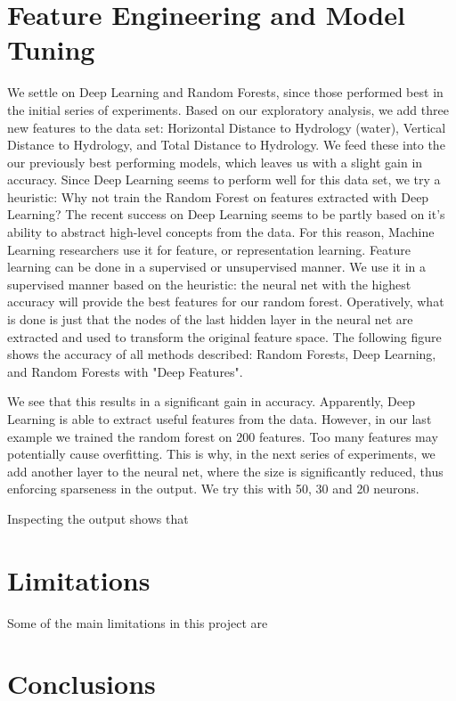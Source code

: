 \documentclass[paper=a4, fontsize=11pt]{scrartcl}
\numberwithin{equation}{section}
\numberwithin{figure}{section}
\numberwithin{table}{section}
\begin{document}
\section{Feature Engineering and Model Tuning}
We settle on Deep Learning and Random Forests, since those performed best in the initial series of experiments. Based on our exploratory analysis, we add three new features to the data set: Horizontal Distance to Hydrology (water), Vertical Distance to Hydrology, and Total Distance to Hydrology. We feed these into the our previously best performing models, which leaves us with a slight gain in accuracy. 
Since Deep Learning seems to perform well for this data set, we try a heuristic: Why not train the Random Forest on features extracted with Deep Learning? The recent success on Deep Learning seems to be partly based on it's ability to abstract high-level concepts from the data. For this reason, Machine Learning researchers use it for feature, or representation learning. Feature learning can be done in a supervised or unsupervised manner. We use it in a supervised manner based on the heuristic: the neural net with the highest accuracy will provide the best features for our random forest. Operatively, what is done is just that the nodes of the last hidden layer in the neural net are extracted and used to transform the original feature space. The following figure shows the accuracy of all methods described: Random Forests, Deep Learning, and Random Forests with "Deep Features". 


We see that this results in a significant gain in accuracy. Apparently, Deep Learning is able to extract useful features from the data. However, in our last example we trained the random forest on 200 features. Too many features may potentially cause overfitting. This is why, in the next series of experiments, we add another layer to the neural net, where the size is significantly reduced, thus enforcing sparseness in the output. We try this with 50, 30 and 20 neurons. 


Inspecting the output shows that



\section{Limitations}
Some of the main limitations in this project are 


\section{Conclusions}

\end{document}
